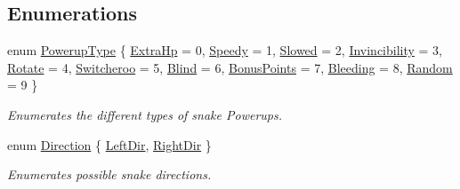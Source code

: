 \subsection*{Enumerations}
\begin{DoxyCompactItemize}
\item 
enum \mbox{\hyperlink{group__snake_gad58f93a5af4c0698fd0b903516c57c31}{Powerup\+Type}} \{ \newline
\mbox{\hyperlink{group__snake_ggad58f93a5af4c0698fd0b903516c57c31a413cbc0639cc9f6bd0bc1ad458c65172}{Extra\+Hp}} = 0, 
\mbox{\hyperlink{group__snake_ggad58f93a5af4c0698fd0b903516c57c31a30fbd24f886755c7169e90d160cf1371}{Speedy}} = 1, 
\mbox{\hyperlink{group__snake_ggad58f93a5af4c0698fd0b903516c57c31a36d16d7d090386fa12eac4c39ead2ad6}{Slowed}} = 2, 
\mbox{\hyperlink{group__snake_ggad58f93a5af4c0698fd0b903516c57c31a8d3a35ac440843c6e2970ae5bb79f6e2}{Invincibility}} = 3, 
\newline
\mbox{\hyperlink{group__snake_ggad58f93a5af4c0698fd0b903516c57c31a9f5b59d58e06567bf56235258fb87ddf}{Rotate}} = 4, 
\mbox{\hyperlink{group__snake_ggad58f93a5af4c0698fd0b903516c57c31a872637de0e2231b32bfd1e9af268cfae}{Switcheroo}} = 5, 
\mbox{\hyperlink{group__snake_ggad58f93a5af4c0698fd0b903516c57c31aa40948f74657ce631284a30ed9913239}{Blind}} = 6, 
\mbox{\hyperlink{group__snake_ggad58f93a5af4c0698fd0b903516c57c31a3ef295e327aa1569534ce2c956b47837}{Bonus\+Points}} = 7, 
\newline
\mbox{\hyperlink{group__snake_ggad58f93a5af4c0698fd0b903516c57c31a1fb8cc2bc87725906f95d32a5271d08a}{Bleeding}} = 8, 
\mbox{\hyperlink{group__snake_ggad58f93a5af4c0698fd0b903516c57c31a73610a7c860f763790e533887a479868}{Random}} = 9
 \}
\begin{DoxyCompactList}\small\item\em Enumerates the different types of snake Powerups. \end{DoxyCompactList}\item 
enum \mbox{\hyperlink{group__snake_ga224b9163917ac32fc95a60d8c1eec3aa}{Direction}} \{ \mbox{\hyperlink{group__snake_gga224b9163917ac32fc95a60d8c1eec3aaa12e40bb84506b93d50f9f558c95dc3bd}{Left\+Dir}}, 
\mbox{\hyperlink{group__snake_gga224b9163917ac32fc95a60d8c1eec3aaa789bd7cb240705a25bad56276fe01fff}{Right\+Dir}}
 \}
\begin{DoxyCompactList}\small\item\em Enumerates possible snake directions. \end{DoxyCompactList}\end{DoxyCompactItemize}
